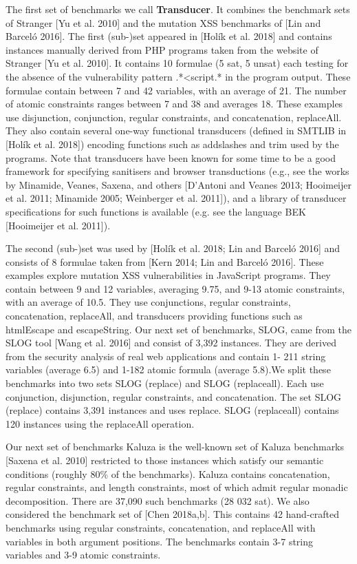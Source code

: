 The first set of benchmarks we call \textbf{Transducer}. It combines the benchmark
sets of Stranger [Yu et al. 2010] and the mutation XSS benchmarks of [Lin and Barceló 2016]. The
first (sub-)set appeared in [Holík et al. 2018] and contains instances manually derived from PHP
programs taken from the website of Stranger [Yu et al. 2010]. It contains 10 formulae (5 sat, 5
unsat) each testing for the absence of the vulnerability pattern .*<script.* in the program output.
These formulae contain between 7 and 42 variables, with an average of 21. The number of atomic
constraints ranges between 7 and 38 and averages 18. These examples use disjunction, conjunction,
regular constraints, and concatenation, replaceAll. They also contain several one-way functional
transducers (defined in SMTLIB in [Holík et al. 2018]) encoding functions such as addslashes and
trim used by the programs. Note that transducers have been known for some time to be a good
framework for specifying sanitisers and browser transductions (e.g., see the works by Minamide,
Veanes, Saxena, and others [D’Antoni and Veanes 2013; Hooimeijer et al. 2011; Minamide 2005;
Weinberger et al. 2011]), and a library of transducer specifications for such functions is available
(e.g. see the language BEK [Hooimeijer et al. 2011]).

The second (sub-)set was used by [Holík et al. 2018; Lin and Barceló 2016] and consists of 8
formulae taken from [Kern 2014; Lin and Barceló 2016]. These examples explore mutation XSS
vulnerabilities in JavaScript programs. They contain between 9 and 12 variables, averaging 9.75, and
9-13 atomic constraints, with an average of 10.5. They use conjunctions, regular constraints, concatenation,
replaceAll, and transducers providing functions such as htmlEscape and escapeString.
Our next set of benchmarks, SLOG, came from the SLOG tool [Wang et al. 2016] and consist of
3,392 instances. They are derived from the security analysis of real web applications and contain 1-
211 string variables (average 6.5) and 1-182 atomic formula (average 5.8).We split these benchmarks
into two sets SLOG (replace) and SLOG (replaceall). Each use conjunction, disjunction, regular
constraints, and concatenation. The set SLOG (replace) contains 3,391 instances and uses replace.
SLOG (replaceall) contains 120 instances using the replaceAll operation.


Our next set of benchmarks Kaluza is the well-known set of Kaluza benchmarks [Saxena et al.
2010] restricted to those instances which satisfy our semantic conditions (roughly 80\% of the
benchmarks). Kaluza contains concatenation, regular constraints, and length constraints, most of
which admit regular monadic decomposition. There are 37,090 such benchmarks (28 032 sat).
We also considered the benchmark set of [Chen 2018a,b]. This contains 42 hand-crafted benchmarks
using regular constraints, concatenation, and replaceAll with variables in both argument
positions. The benchmarks contain 3-7 string variables and 3-9 atomic constraints.


